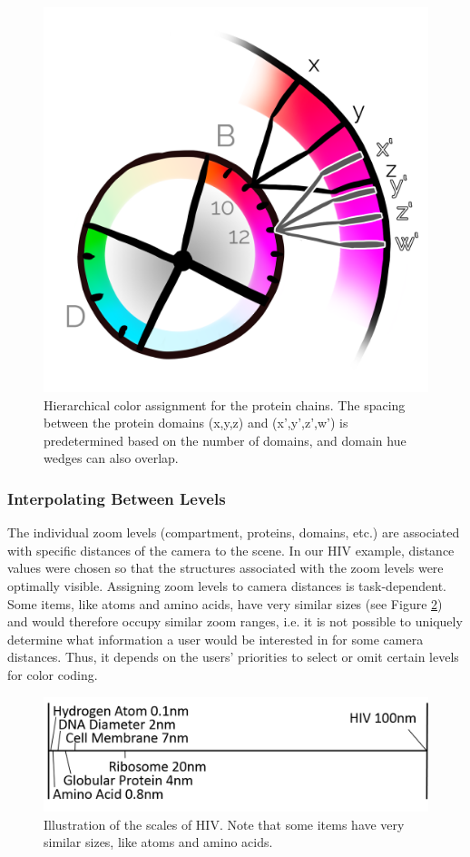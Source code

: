 \documentclass{egpubl}
\begin{document}
	
	\begin{figure}
		\centering
		\includegraphics[width=0.4\linewidth]{Figures/overlap}
		\caption{Hierarchical color assignment for the protein chains. 
			The spacing between the protein domains (x,y,z) and (x',y',z',w') is predetermined based on the number of domains, and domain hue wedges can also overlap. 
		}
		\label{fig:overlap}
	\end{figure}
	
	

	
	\subsubsection{Interpolating Between Levels}
	
	The individual zoom levels (compartment, proteins, domains, etc.) are associated with specific distances of the camera to the scene. 
	In our HIV example, distance values were chosen so that the structures associated with the zoom levels were optimally visible. 
	Assigning zoom levels to camera distances is task-dependent. 
	Some items, like atoms and amino acids, have very similar sizes (see Figure \ref{fig:hivScale}) and would therefore occupy similar zoom ranges, i.e. it is not possible to uniquely determine what information a user would be interested in for some camera distances.
	Thus, it depends on the users' priorities to select or omit certain levels for color coding. 
	
	\begin{figure}
		\centering
		\includegraphics[width=0.7\linewidth]{Figures/hivscale}
		\caption{Illustration of the scales of HIV. Note that some items have very similar sizes, like atoms and amino acids. }
		\label{fig:hivScale}
	\end{figure}
	
\end{document}
